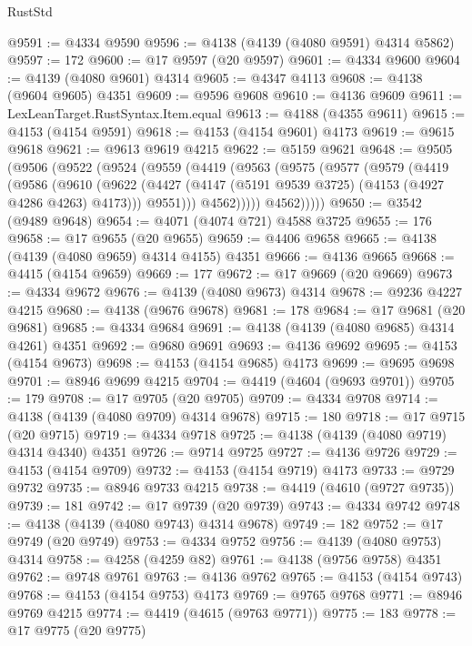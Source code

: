 \begin{lexlean}{RustStd}
\begin{coremodule}
@9591 := @4334 @9590
@9596 := @4138 (@4139 (@4080 @9591) @4314 @5862)
@9597 := 172
@9600 := @17 @9597 (@20 @9597)
@9601 := @4334 @9600
@9604 := @4139 (@4080 @9601) @4314
@9605 := @4347 @4113
@9608 := @4138 (@9604 @9605) @4351
@9609 := @9596 @9608
@9610 := @4136 @9609
@9611 := LexLeanTarget.RustSyntax.Item.equal
@9613 := @4188 (@4355 @9611)
@9615 := @4153 (@4154 @9591)
@9618 := @4153 (@4154 @9601) @4173
@9619 := @9615 @9618
@9621 := @9613 @9619 @4215
@9622 := @5159 @9621
@9648 := @9505
    (@9506
      (@9522
        (@9524
          (@9559
            (@4419
              (@9563
                (@9575
                  (@9577
                    (@9579
                      (@4419
                        (@9586
                          (@9610
                            (@9622
                              (@4427 (@4147 (@5191 @9539 @3725) (@4153 (@4927 @4286 @4263) @4173)))
                              @9551)))
                        @4562)))))
              @4562)))))
@9650 := @3542 (@9489 @9648)
@9654 := @4071 (@4074 @721) @4588 @3725
@9655 := 176
@9658 := @17 @9655 (@20 @9655)
@9659 := @4406 @9658
@9665 := @4138 (@4139 (@4080 @9659) @4314 @4155) @4351
@9666 := @4136 @9665
@9668 := @4415 (@4154 @9659)
@9669 := 177
@9672 := @17 @9669 (@20 @9669)
@9673 := @4334 @9672
@9676 := @4139 (@4080 @9673) @4314
@9678 := @9236 @4227 @4215
@9680 := @4138 (@9676 @9678)
@9681 := 178
@9684 := @17 @9681 (@20 @9681)
@9685 := @4334 @9684
@9691 := @4138 (@4139 (@4080 @9685) @4314 @4261) @4351
@9692 := @9680 @9691
@9693 := @4136 @9692
@9695 := @4153 (@4154 @9673)
@9698 := @4153 (@4154 @9685) @4173
@9699 := @9695 @9698
@9701 := @8946 @9699 @4215
@9704 := @4419 (@4604 (@9693 @9701))
@9705 := 179
@9708 := @17 @9705 (@20 @9705)
@9709 := @4334 @9708
@9714 := @4138 (@4139 (@4080 @9709) @4314 @9678)
@9715 := 180
@9718 := @17 @9715 (@20 @9715)
@9719 := @4334 @9718
@9725 := @4138 (@4139 (@4080 @9719) @4314 @4340) @4351
@9726 := @9714 @9725
@9727 := @4136 @9726
@9729 := @4153 (@4154 @9709)
@9732 := @4153 (@4154 @9719) @4173
@9733 := @9729 @9732
@9735 := @8946 @9733 @4215
@9738 := @4419 (@4610 (@9727 @9735))
@9739 := 181
@9742 := @17 @9739 (@20 @9739)
@9743 := @4334 @9742
@9748 := @4138 (@4139 (@4080 @9743) @4314 @9678)
@9749 := 182
@9752 := @17 @9749 (@20 @9749)
@9753 := @4334 @9752
@9756 := @4139 (@4080 @9753) @4314
@9758 := @4258 (@4259 @82)
@9761 := @4138 (@9756 @9758) @4351
@9762 := @9748 @9761
@9763 := @4136 @9762
@9765 := @4153 (@4154 @9743)
@9768 := @4153 (@4154 @9753) @4173
@9769 := @9765 @9768
@9771 := @8946 @9769 @4215
@9774 := @4419 (@4615 (@9763 @9771))
@9775 := 183
@9778 := @17 @9775 (@20 @9775)

\end{coremodule}
\end{lexlean}
